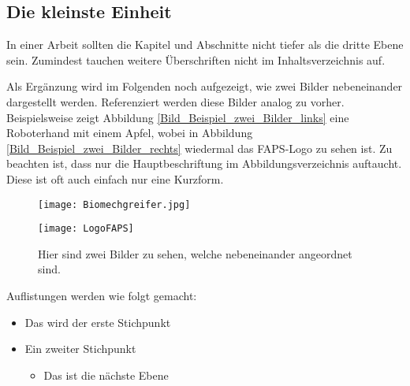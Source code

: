 \subsection{Die kleinste Einheit}
In einer Arbeit sollten die Kapitel und Abschnitte nicht tiefer als die dritte
Ebene sein. Zumindest tauchen weitere Überschriften nicht im Inhaltsverzeichnis auf.

Als Ergänzung wird im Folgenden noch aufgezeigt, wie zwei Bilder nebeneinander
dargestellt werden. Referenziert werden diese Bilder analog zu vorher. Beispielsweise zeigt Abbildung \ref{Bild_Beispiel_zwei_Bilder_links} eine Roboterhand mit einem Apfel, wobei in Abbildung \ref{Bild_Beispiel_zwei_Bilder_rechts} wiedermal das FAPS-Logo zu sehen ist. Zu beachten ist, dass nur die Hauptbeschriftung im Abbildungsverzeichnis auftaucht. Diese ist oft auch einfach nur eine Kurzform.

\begin{figure}[ht!]

\newcommand{\pictureheight}{5cm}

	\begin{minipage}[c]{.49\textwidth}
		\centering
		\texttt{[image: Biomechgreifer.jpg]}
		\label{Bild_Beispiel_zwei_Bilder_links}
	\end{minipage}
%	
	\begin{minipage}[c]{.49\textwidth}
    		\centering
		\texttt{[image: LogoFAPS]}
		\label{Bild_Beispiel_zwei_Bilder_rechts}
	\end{minipage}
    	
    	\caption[Zwei Bilder nebeneinander]{Hier sind zwei Bilder zu sehen, welche nebeneinander angeordnet sind.}
	\label{Bild_Beispiel_zwei_Bilder}

\end{figure}

Auflistungen werden wie folgt gemacht:
\begin{itemize}
	\item Das wird der erste Stichpunkt
	\item Ein zweiter Stichpunkt
	
	\begin{itemize}
		\item Das ist die nächste Ebene
	\end{itemize}
	
\end{itemize}